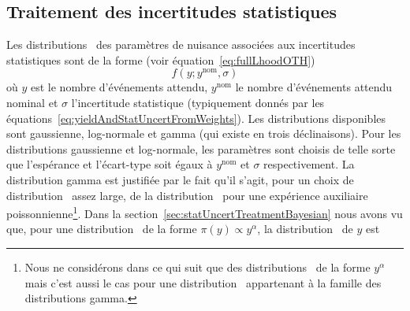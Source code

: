 \subsection{Traitement des incertitudes statistiques}
\label{sec:OTHTreatmentStatUncerts}

Les distributions \prior~des param\`etres de nuisance associ\'ees aux incertitudes statistiques sont de la forme (voir \'equation~\ref{eq:fullLhoodOTH})
\begin{equation}
\label{eq:statConstraintPdfGeneralForm}
f(y;y^{\text{nom}},\sigma)
\end{equation}
o\`u $y$ est le nombre d'\'ev\'enements attendu, $y^{\text{nom}}$ le nombre d'\'ev\'enements attendu nominal et $\sigma$ l'incertitude statistique (typiquement donn\'es par les \'equations~\ref{eq:yieldAndStatUncertFromWeights}). 
Les distributions disponibles sont gaussienne, log-normale et gamma (qui existe en trois d\'eclinaisons). 
Pour les distributions gaussienne et log-normale, les param\`etres sont choisis de telle sorte que l'esp\'erance et l'\'ecart-type soit \'egaux \`a $y^{\text{nom}}$ et $\sigma$ respectivement. 
La distribution gamma est justifi\'ee par le fait qu'il s'agit, pour un choix de distribution \prior~assez large, de la distribution \posterior~pour une exp\'erience auxiliaire poissonnienne\footnote{Nous ne consid\'erons dans ce qui suit que des distributions \prior~de la forme $y^\alpha$ mais c'est aussi le cas pour une distribution \prior~appartenant \`a la famille des distributions gamma.}. 
Dans la section~\ref{sec:statUncertTreatmentBayesian} nous avons vu que, pour une distribution \prior~de la forme $\pi\left(y\right)\propto y^\alpha$, la distribution \posterior~de $y$ est

